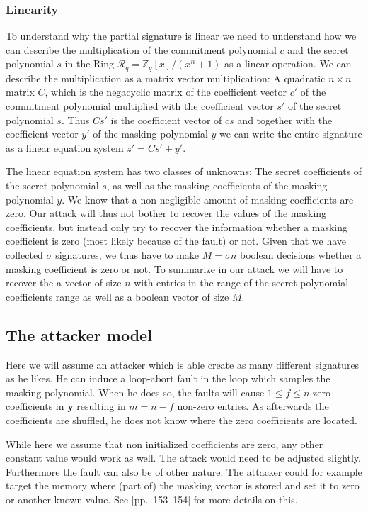 \documentclass[a4paper,titlepage]{article}
\begin{document}
\subsubsection{Linearity}
\label{sec:linearity}
To understand why the partial signature is linear we need to understand how we can describe the multiplication of the commitment polynomial $c$ and the secret polynomial $s$ in the Ring  $\mathcal{R}_q = \mathds{Z}_q[x]/(x^n+1)$  as a linear operation.
We can describe the multiplication as a matrix vector multiplication: A quadratic $n \times n$ matrix $C$, which is the negacyclic matrix of the coefficient vector $c'$ of the commitment polynomial multiplied with the coefficient vector $s'$ of the secret polynomial $s$. Thus $Cs'$ is the coefficient vector of  $cs$ and together with the coefficient vector $y'$ of the masking polynomial $y$ we can write the entire signature as a linear equation system $z' = Cs' + y'$. 

The  linear equation system has two classes of unknowns: The secret coefficients of the secret polynomial $s$, as well as the masking coefficients of the masking polynomial $y$.
We know that a non-negligible amount of masking coefficients are zero. Our attack will thus not bother to recover the values of the masking coefficients, but instead only try to recover the information whether a masking coefficient is zero (most likely because of the fault) or not. Given that we have collected $\sigma$ signatures, we thus have to make $M = \sigma n$ boolean decisions whether a masking coefficient is zero or not. To summarize in our attack we will have to recover the a vector of size $n$ with entries in the range of the secret polynomial coefficients range as well as a boolean vector of size $M$.


\subsection{The attacker model}
\label{sec:attackmodelgeneral}
Here we will assume an attacker which is able create as many different signatures as he likes. He can induce a loop-abort fault in the loop which samples the masking polynomial. When he does so, the faults will cause $1 \leq f \leq n$ zero coefficients in $\bm{y}$ resulting in $m = n - f$ non-zero entries. As afterwards the coefficients are shuffled, he does not know where the zero coefficients are located.

While here we assume that non initialized coefficients are zero, any other constant value would work as well. The attack would need to be adjusted slightly. 
Furthermore the fault can also be of other nature. The attacker could for example target the memory where (part of) the masking vector is stored and set it to zero or another known value. See \cite{espitau}[pp.~153--154] for more details on this.
\end{document}
